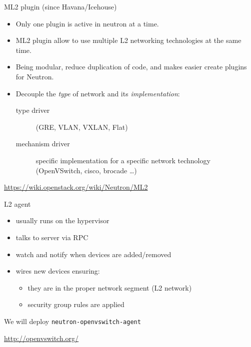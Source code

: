 \documentclass[english,serif,mathserif,xcolor=pdftex,dvipsnames,table]{beamer}
\begin{document}
\begin{frame}
  {ML2 plugin (since Havana/Icehouse)}
  \begin{itemize}
  \item Only one plugin is active in neutron at a time.
  \item ML2 plugin allow to use multiple L2 networking technologies at the
    same time.
  \item Being modular, reduce duplication of code, and makes easier create
    plugins for Neutron.

  \item Decouple the \textit{type} of network and its \textit{implementation}:
    \begin{description}
    \item[type driver] (GRE, VLAN, VXLAN, Flat)
    \item[mechanism driver] specific implementation for a specific
      network technology (OpenVSwitch, cisco, brocade \ldots)
    \end{description}
  \end{itemize}
\+
{\footnotesize\url{https://wiki.openstack.org/wiki/Neutron/ML2}}
\end{frame}

\begin{frame}
  {L2 agent}
  \begin{itemize}
  \item usually runs on the hypervisor
  \item talks to server via RPC
  \item watch and notify when devices are added/removed
  \item wires new devices ensuring:
    \begin{itemize}
    \item they are in the proper network segment (L2 network)
    \item security group rules are applied
    \end{itemize}
  \end{itemize}

  \+
  We will deploy \texttt{neutron-openvswitch-agent}

  \+
  {\footnotesize\url{http://openvswitch.org/}}
\end{frame}


\end{document}
